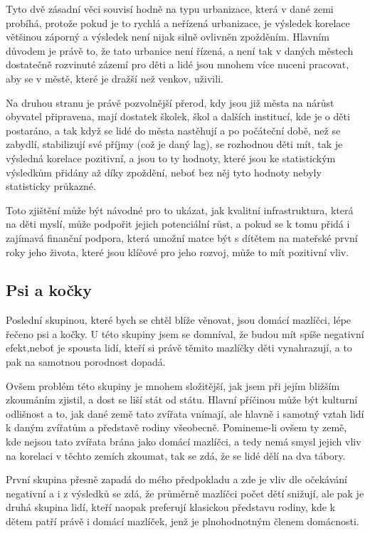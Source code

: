 \documentclass[thesis=M,czech]{FITthesis}[2022/10/08]
\begin{document}
Tyto dvě zásadní věci souvisí hodně na typu urbanizace, která v dané zemi probíhá, protože pokud je to rychlá a neřízená urbanizace, je výsledek korelace většinou záporný a výsledek není nijak silně ovlivněn zpožděním. Hlavním důvodem je právě to, že tato urbanice není řízená, a není tak v daných městech dostatečně rozvinuté zázemí pro děti a lidé jsou mnohem více nuceni pracovat, aby se v městě, které je dražší než venkov, uživili. 

Na druhou stranu je právě pozvolnější přerod, kdy jsou již města na nárůst obyvatel připravena, mají dostatek školek, škol a dalších institucí, kde je o děti postaráno, a tak když se lidé do města nastěhují a po počáteční době, než se zabydlí, stabilizují své příjmy (což je daný lag), se rozhodnou  děti mít, tak je výsledná korelace pozitivní, a jsou to ty hodnoty, které jsou ke statistickým výsledkům přidány až díky zpoždění, neboť bez něj tyto hodnoty nebyly statisticky průkazné.

Toto zjištění může být návodné pro to ukázat, jak kvalitní infrastruktura, která na děti myslí, může podpořit jejich potenciální růst, a pokud se k tomu přidá i zajímavá finanční podpora, která umožní matce být s dítětem na mateřské první roky jeho života, které jsou klíčové pro jeho rozvoj, může to mít pozitivní vliv. 


\subsection{Psi a kočky}
Poslední skupinou, které bych se chtěl blíže věnovat, jsou domácí mazlíčci, lépe řečeno psi a kočky. U této skupiny jsem se domníval, že budou mít spíše negativní efekt,neboť je spousta lidí, kteří si právě těmito mazlíčky děti vynahrazují, a to pak na samotnou porodnost dopadá.

Ovšem problém této skupiny je mnohem složitější, jak jsem při jejím bližším zkoumáním zjistil, a dost se liší stát od státu. Hlavní příčinou může být kulturní odlišnost a to, jak dané země tato zvířata vnímají, ale hlavně i samotný vztah lidí k daným zvířatům a představě rodiny všeobecně. Pomineme-li ovšem ty země, kde nejsou tato zvířata brána jako domácí mazlíčci, a tedy nemá smysl jejich vliv na korelaci v těchto zemích zkoumat, tak se zdá, že se lidé dělí na dva tábory. 

První skupina přesně zapadá do mého předpokladu a zde je vliv dle očekávání negativní a i z výsledků se zdá, že průměrně mazlíčci počet dětí snižují, ale pak je druhá skupina lidí, kteří naopak preferují klasickou představu rodiny, kde k dětem patří právě i domácí mazlíček, jenž je plnohodnotným členem domácnosti. 
\end{document}
